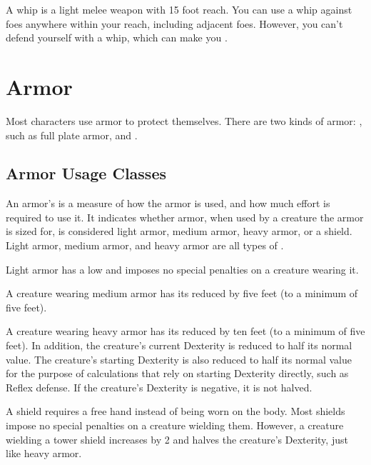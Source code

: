          A whip is a light melee weapon with 15 foot reach.
        You can use a whip against foes anywhere within your reach, including adjacent foes.
        However, you can't defend yourself with a whip, which can make you .

\section{Armor}\label{Armor}

    Most characters use armor to protect themselves. There are two kinds of armor: , such as full plate armor, and .

    \subsection{Armor Usage Classes}\label{Armor Usage Classes}
        An armor's  is a measure of how the armor is used, and how much effort is required to use it.
        It indicates whether armor, when used by a creature the armor is sized for, is considered light armor, medium armor, heavy armor, or a shield.
        Light armor, medium armor, and heavy armor are all types of .

         Light armor has a low  and imposes no special penalties on a creature wearing it.

         A creature wearing medium armor has its  reduced by five feet (to a minimum of five feet).

         A creature wearing heavy armor has its  reduced by ten feet (to a minimum of five feet).
        In addition, the creature's current Dexterity is reduced to half its normal value.
        The creature's starting Dexterity is also reduced to half its normal value for the purpose of calculations that rely on starting Dexterity directly, such as Reflex defense.
        If the creature's Dexterity is negative, it is not halved.

         A shield requires a free hand instead of being worn on the body.
        Most shields impose no special penalties on a creature wielding them.
        However, a creature wielding a tower shield increases  by 2 and halves the creature's Dexterity, just like heavy armor.

